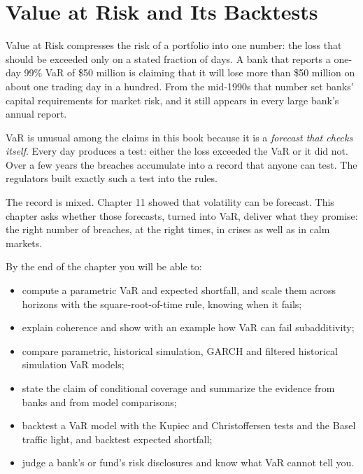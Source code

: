 \makeatletter
{}
\makeatother

\chapter{Value at Risk and Its Backtests}
\label{ch:13}

Value at Risk compresses the risk of a portfolio into one number: the loss that should be exceeded only on a stated fraction of days. A bank that reports a one-day 99\% VaR of \$50 million is claiming that it will lose more than \$50 million on about one trading day in a hundred. From the mid-1990s that number set banks' capital requirements for market risk, and it still appears in every large bank's annual report.

VaR is unusual among the claims in this book because it is a \emph{forecast that checks itself}. Every day produces a test: either the loss exceeded the VaR or it did not. Over a few years the breaches accumulate into a record that anyone can test. The regulators built exactly such a test into the rules.

The record is mixed. Chapter 11 showed that volatility can be forecast. This chapter asks whether those forecasts, turned into VaR, deliver what they promise: the right number of breaches, at the right times, in crises as well as in calm markets.

By the end of the chapter you will be able to:

\begin{itemize}
  \item compute a parametric VaR and expected shortfall, and scale them across horizons with the square-root-of-time rule, knowing when it fails;
  \item explain coherence and show with an example how VaR can fail subadditivity;
  \item compare parametric, historical simulation, GARCH and filtered historical simulation VaR models;
  \item state the claim of conditional coverage and summarize the evidence from banks and from model comparisons;
  \item backtest a VaR model with the Kupiec and Christoffersen tests and the Basel traffic light, and backtest expected shortfall;
  \item judge a bank's or fund's risk disclosures and know what VaR cannot tell you.
\end{itemize}

